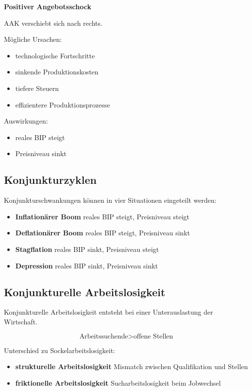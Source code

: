 \textbf{Positiver Angebotsschock}

AAK verschiebt sich nach rechts.

Mögliche Ursachen:

\begin{itemize}
\item technologische Fortschritte
\item sinkende Produktionskosten
\item tiefere Steuern
\item effizientere Produktionsprozesse
\end{itemize}

Auswirkungen:

\begin{itemize}
\item reales BIP steigt
\item Preisniveau sinkt
\end{itemize}


\subsection{Konjunkturzyklen}

Konjunkturschwankungen können in vier Situationen eingeteilt werden:

\begin{itemize}
\item \textbf{Inflationärer Boom}  
reales BIP steigt, Preisniveau steigt

\item \textbf{Deflationärer Boom}  
reales BIP steigt, Preisniveau sinkt

\item \textbf{Stagflation}  
reales BIP sinkt, Preisniveau steigt

\item \textbf{Depression}  
reales BIP sinkt, Preisniveau sinkt
\end{itemize}


\subsection{Konjunkturelle Arbeitslosigkeit}

Konjunkturelle Arbeitslosigkeit entsteht bei einer Unterauslastung der Wirtschaft.

\[
\text{Arbeitssuchende} > \text{offene Stellen}
\]

Unterschied zu Sockelarbeitslosigkeit:

\begin{itemize}
\item \textbf{strukturelle Arbeitslosigkeit}  
Mismatch zwischen Qualifikation und Stellen

\item \textbf{friktionelle Arbeitslosigkeit}  
Sucharbeitslosigkeit beim Jobwechsel
\end{itemize}



